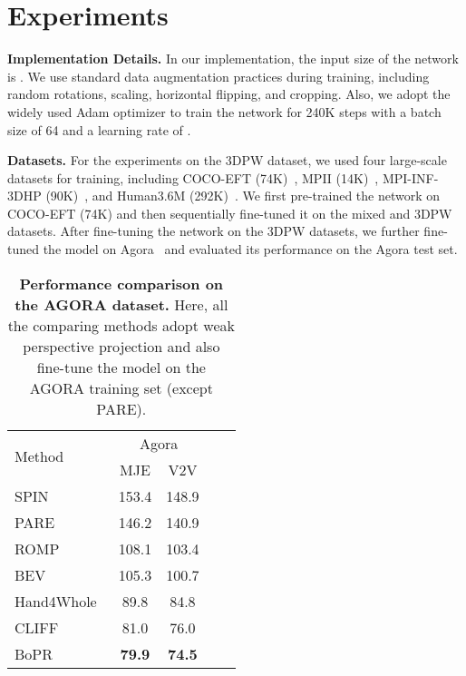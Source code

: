 \documentclass[10pt,twocolumn,letterpaper]{article}
\begin{document}
\section{Experiments}

\noindent\textbf{Implementation Details.}
In our implementation, the input size of the network is . We use standard data augmentation practices during training, including random rotations, scaling, horizontal flipping, and cropping. Also, we adopt the widely used Adam optimizer to train the network for 240K steps with a batch size of 64 and a learning rate of . 



\noindent\textbf{Datasets.}
For the experiments on the 3DPW dataset, we used four large-scale datasets for training, including COCO-EFT (74K)~\cite{lin2014microsoft}, MPII (14K)~\cite{andriluka20142d}, MPI-INF-3DHP (90K)~\cite{mehta2017monocular}, and Human3.6M (292K)~\cite{ionescu2013human3}. We first pre-trained the network on COCO-EFT (74K) and then sequentially fine-tuned it on the mixed and 3DPW datasets. After fine-tuning the network on the 3DPW datasets, we further fine-tuned the model on Agora~\cite{patel2021agora} and evaluated its performance on the Agora test set.




\begin{table}
\centering
\begin{tabular}{lcccc}
\toprule[1.5pt]
\multirow{2}{*}{Method} & \multicolumn{2}{c}{Agora}  \\ 
 & MJE  & V2V  \\ \hline
SPIN~\cite{kolotouros2019learning} & 153.4 & 148.9 \\ 
PARE~\cite{kocabas2021pare} & 146.2 & 140.9 \\ 
ROMP~\cite{sun2021monocular} & 108.1 & 103.4 \\
BEV~\cite{sun2022putting} & 105.3 & 100.7 \\ 
Hand4Whole~\cite{sun2022putting} & 89.8 & 84.8 \\ 
CLIFF~\cite{li2022cliff} & 81.0 & 76.0 \\ 
\hline
BoPR & \textbf{79.9} & \textbf{74.5}  \\ \bottomrule[1.5pt]
\end{tabular}
\caption{\textbf{Performance comparison on the AGORA dataset.} Here, all the comparing methods adopt weak perspective projection and also fine-tune the model on the AGORA training set (except PARE).}
\label{tab:agora}
\end{table}
\end{document}
